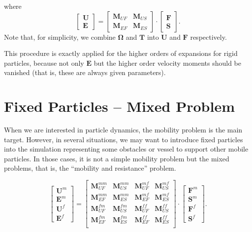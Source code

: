 \documentclass{book}
\begin{document}
where
\begin{equation}
  \left[
    \begin{array}{c}
      \bm{U}\\
      \bm{E}
    \end{array}
  \right]
  =
  \left[
    \begin{array}{cc}
      \bm{M}_{UF} & \bm{M}_{US}\\
      \bm{M}_{EF} & \bm{M}_{ES}
    \end{array}
  \right]
  \cdot
  \left[
    \begin{array}{c}
      \bm{F}\\
      \bm{S}
    \end{array}
  \right]
  .
\end{equation}
Note that, for simplicity, we combine $\bm{\Omega}$ and $\bm{T}$ into
$\bm{U}$ and $\bm{F}$ respectively.


This procedure is exactly applied for the higher orders
of expansions for rigid particles, because not only $\bm{E}$
but the higher order velocity moments should be vanished
(that is, these are always given parameters).


\section{Fixed Particles -- Mixed Problem}
When we are interested in particle dynamics,
the mobility problem is the main target.
However, in several situations, we may want to introduce
fixed particles into the simulation representing some
obstacles or vessel to support other mobile particles.
\cite{IchikiHayakawa1995}
In those cases, it is not a simple mobility problem but
the mixed problems, that is,
the ``mobility and resistance'' problem.

\begin{equation}
  \left[
    \begin{array}{c}
      \bm{U}^{m}\\
      \bm{E}^{m}\\
      \bm{U}^{f}\\
      \bm{E}^{f}
    \end{array}
  \right]
  =
  \left[
    \begin{array}{cccc}
      \bm{M}_{UF}^{mm} & \bm{M}_{US}^{mm} & \bm{M}_{UF}^{mf} & \bm{M}_{US}^{mf}\\
      \bm{M}_{EF}^{mm} & \bm{M}_{ES}^{mm} & \bm{M}_{EF}^{mf} & \bm{M}_{ES}^{mf}\\
      \bm{M}_{UF}^{fm} & \bm{M}_{US}^{fm} & \bm{M}_{UF}^{ff} & \bm{M}_{US}^{ff}\\
      \bm{M}_{EF}^{fm} & \bm{M}_{ES}^{fm} & \bm{M}_{EF}^{ff} & \bm{M}_{ES}^{ff}\\
    \end{array}
  \right]
  \cdot
  \left[
    \begin{array}{c}
      \bm{F}^{m}\\
      \bm{S}^{m}\\
      \bm{F}^{f}\\
      \bm{S}^{f}
    \end{array}
  \right]
  .
\end{equation}
\end{document}
